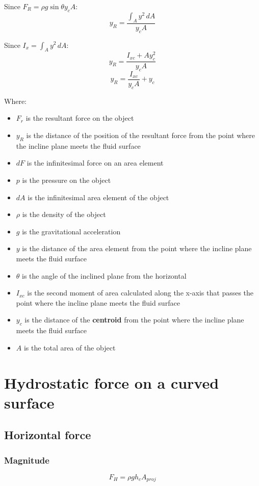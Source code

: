 \documentclass[11pt]{article}
\begin{document}
Since \(F_R = \rho g \sin \theta y_c A\):
\[y_R = \frac{\int_A y^2 \, dA}{y_c A}\]

Since \(I_x = \int_A y^2 \, dA\):
\[y_R = \frac{I_{xc} + Ay_c^2}{y_c A}\]
\[y_R = \frac{I_{xc}}{y_c A} + y_c\]

Where:
\begin{itemize}
\item \(F_r\) is the resultant force on the object
\item \(y_R\) is the distance of the position of the resultant force from the point where the incline plane meets the fluid surface
\item \(dF\) is the infinitesimal force on an area element
\item \(p\) is the pressure on the object
\item \(dA\) is the infinitesimal area element of the object
\item \(\rho\) is the density of the object
\item \(g\) is the gravitational acceleration
\item \(y\) is the distance of the area element from the point where the incline plane meets the fluid surface
\item \(\theta\) is the angle of the inclined plane from the horizontal
\item \(I_{xc}\) is the second moment of area calculated along the x-axis that passes the point where the incline plane meets the fluid surface
\item \(y_c\) is the distance of the \textbf{centroid} from the point where the incline plane meets the fluid surface
\item \(A\) is the total area of the object
\end{itemize}


\section{Hydrostatic force on a curved surface}
\label{sec:orgf067412}

\subsection{Horizontal force}
\label{sec:orge84510c}

\subsubsection{Magnitude}
\label{sec:org4d3419d}
\[F_H = \rho g h_c A_{proj}\]
\end{document}

